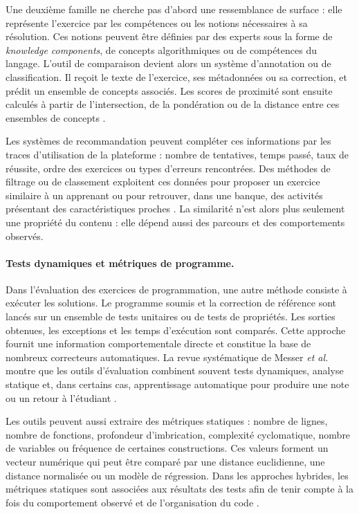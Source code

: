 \documentclass[12pt,a4paper,oneside]{report}
\begin{document}
Une deuxième famille ne cherche pas d'abord une ressemblance de surface :
elle représente l'exercice par les compétences ou les notions nécessaires à
sa résolution. Ces notions peuvent être définies par des experts sous la
forme de \emph{knowledge components}, de concepts algorithmiques ou de
compétences du langage. L'outil de comparaison devient alors un système
d'annotation ou de classification. Il reçoit le texte de l'exercice, ses
métadonnées ou sa correction, et prédit un ensemble de concepts associés.
Les scores de proximité sont ensuite calculés à partir de l'intersection,
de la pondération ou de la distance entre ces ensembles de concepts
\cite{tian_2022,hosseini_2017}.

Les systèmes de recommandation peuvent compléter ces informations par les
traces d'utilisation de la plateforme : nombre de tentatives, temps passé,
taux de réussite, ordre des exercices ou types d'erreurs rencontrées. Des
méthodes de filtrage ou de classement exploitent ces données pour proposer
un exercice similaire à un apprenant ou pour retrouver, dans une banque,
des activités présentant des caractéristiques proches
\cite{liu_2018}. La similarité n'est alors plus seulement une propriété du
contenu : elle dépend aussi des parcours et des comportements observés.

\paragraph{Tests dynamiques et métriques de programme.}

Dans l'évaluation des exercices de programmation, une autre méthode consiste
à exécuter les solutions. Le programme soumis et la correction de référence
sont lancés sur un ensemble de tests unitaires ou de tests de propriétés.
Les sorties obtenues, les exceptions et les temps d'exécution sont comparés.
Cette approche fournit une information comportementale directe et constitue
la base de nombreux correcteurs automatiques. La revue systématique de
Messer \emph{et al.} montre que les outils d'évaluation combinent souvent
tests dynamiques, analyse statique et, dans certains cas, apprentissage
automatique pour produire une note ou un retour à l'étudiant
\cite{messer_2024}.

Les outils peuvent aussi extraire des métriques statiques : nombre de lignes,
nombre de fonctions, profondeur d'imbrication, complexité cyclomatique,
nombre de variables ou fréquence de certaines constructions. Ces valeurs
forment un vecteur numérique qui peut être comparé par une distance euclidienne,
une distance normalisée ou un modèle de régression. Dans les approches
hybrides, les métriques statiques sont associées aux résultats des tests afin
de tenir compte à la fois du comportement observé et de l'organisation du
code \cite{messer_2024,vujosevic-janicic_software_2013}.
\end{document}
